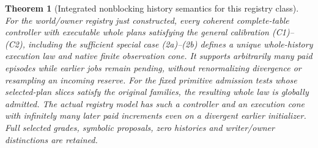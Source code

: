 \documentclass{article}
\newtheorem{theorem}{Theorem}\newtheorem{proposition}{Proposition}
\begin{document}
\begin{theorem}[Integrated nonblocking history semantics for this registry class]
For the world/owner registry just constructed, every coherent complete-table controller with executable whole plans satisfying the general calibration (C1)--(C2), including the sufficient special case (2a)--(2b) defines a unique whole-history execution law and native finite observation cone. It supports arbitrarily many paid episodes while earlier jobs remain pending, without renormalizing divergence or resampling an incoming reserve. For the fixed primitive admission tests whose selected-plan slices satisfy the original families, the resulting whole law is globally admitted. The actual registry model has such a controller and an execution cone with infinitely many later paid increments even on a divergent earlier initializer. Full selected grades, symbolic proposals, zero histories and writer/owner distinctions are retained.
\end{theorem}
\end{document}
